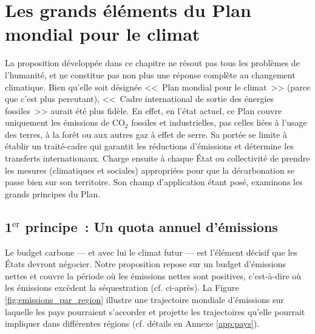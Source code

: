 \documentclass[a5paper,french,openany]{memoir}
\begin{document}
\chapter{Les grands éléments du Plan mondial pour le climat\label{ch:principes}}

La proposition développée dans ce chapitre ne résout pas tous les problèmes de l'humanité, et ne constitue pas non plus une réponse complète au changement climatique. Bien qu'elle soit désignée <<~Plan mondial pour le climat~>> (parce que c'est plus percutant), <<~Cadre international de sortie des énergies fossiles~>> aurait été plus fidèle.  %
En effet, en l'état actuel, ce Plan couvre uniquement les émissions de CO$_\text{2}$ fossiles et industrielles, pas celles liées à l'usage des terres, à la forêt ou aux autres gaz à effet de serre. %
Sa portée se limite à établir un traité-cadre qui garantit les réductions d'émissions et détermine les transferts internationaux. Charge ensuite à chaque État ou collectivité de prendre les mesures (climatiques et sociales) appropriées pour que la décarbonation se passe bien sur son territoire. Son champ d'application étant posé, %
examinons les grands principes du Plan.

\section{1$^\text{er}$ principe~: Un quota annuel d'émissions}\label{sec:pcp_quota}

Le budget carbone --- et avec lui le climat futur --- est l'élément décisif que les États devront négocier. 
Notre proposition repose sur un budget d'émissions nettes et couvre la période où les émissions nettes sont positives, c'est-à-dire où les émissions excèdent la séquestration (cf. ci-après). La Figure \ref{fig:emissions_par_region} illustre une trajectoire mondiale d'émissions sur laquelle les pays pourraient s'accorder et projette les trajectoires qu'elle pourrait impliquer dans différentes régions (cf. détails en Annexe \ref{app:pays}). 
\end{document}
